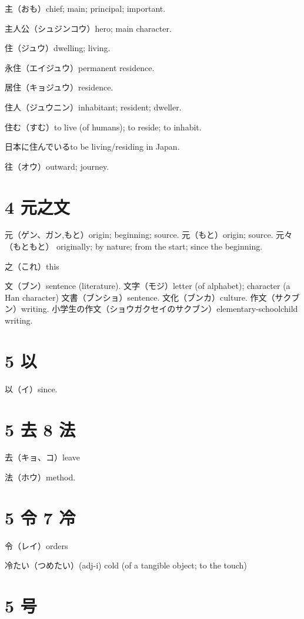 主（おも）chief; main; principal; important.

主人公（シュジンコウ）hero; main character.

住（ジュウ）dwelling; living.

永住（エイジュウ）permanent residence.

居住（キョジュウ）residence.

住人（ジュウニン）inhabitant; resident; dweller.

住む（すむ）to live (of humans); to reside; to inhabit.

日本に住んでいるto be living/residing in Japan.

往（オウ）outward; journey.

\section{4 元之文}

元（ゲン、ガン,もと）origin; beginning; source.
元（もと）origin; source.
元々（もともと）
originally; by nature; from the start; since the beginning.

之（これ）this

文（ブン）sentence (literature).
文字（モジ）letter (of alphabet); character (a Han character)
文書（ブンショ）sentence.
文化（ブンカ）culture.
作文（サクブン）writing.
小学生の作文（ショウガクセイのサクブン）elementary-schoolchild writing.

\section{5 以}

以（イ）since.

\section{5 去 8 法}

去（キョ、コ）leave

法（ホウ）method.

\section{5 令 7 冷}

令（レイ）orders

冷たい（つめたい）(adj-i) cold (of a tangible object; to the touch)

\section{5 号}

